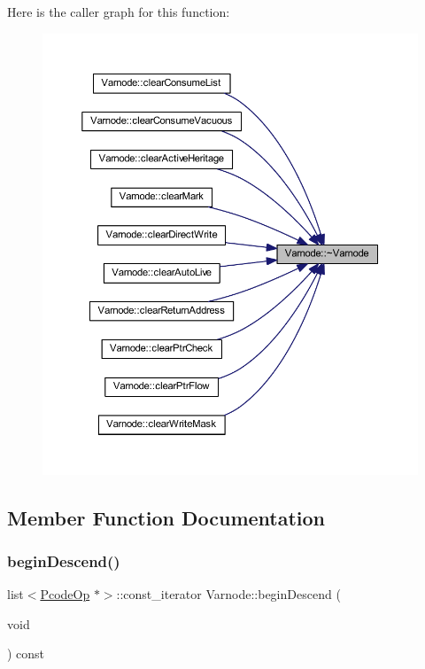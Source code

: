 Here is the caller graph for this function\+:
\nopagebreak
\begin{figure}[H]
\begin{center}
\leavevmode
\includegraphics[width=350pt]{class_varnode_a923a208c2607e493576deac0765ef058_icgraph}
\end{center}
\end{figure}


\subsection{Member Function Documentation}
\mbox{\label{class_varnode_a9a3b5ce1f30367b6652321fda08d25cb}} 
\subsubsection{\texorpdfstring{beginDescend()}{beginDescend()}}
{\footnotesize\ttfamily list$<$\mbox{\hyperlink{class_pcode_op}{Pcode\+Op}} $\ast$$>$\+::const\+\_\+iterator Varnode\+::begin\+Descend (\begin{DoxyParamCaption}\item[{void}]{ }\end{DoxyParamCaption}) const\hspace{0.3cm}{\ttfamily [inline]}}



